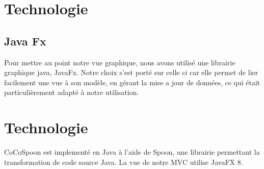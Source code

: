 \section{Technologie}
\subsection{Java Fx}
\par Pour mettre au point notre vue graphique, nous avons utilisé une librairie graphique java, JavaFx. Notre choix s'est porté sur celle ci car elle permet de lier facilement une vue à son modèle, en gérant la mise a jour de données, ce qui était particulièrement adapté à notre utilisation.\section{Technologie}

CoCoSpoon est implementé en Java à l'aide de Spoon, une librairie permettant la transformation de code source Java. La vue de notre MVC utilise JavaFX 8. 